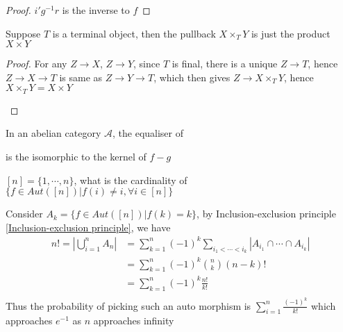 \documentclass[main]{subfiles}
\begin{document}
\begin{proof}
$i'g^{-1}r$ is the inverse to $f$
\end{proof}

\begin{exercise}
Suppose $T$ is a terminal object, then the pullback $X\times_TY$ is just the product $X\times Y$
\end{exercise}

\begin{proof}
For any $Z\to X$, $Z\to Y$, since $T$ is final, there is a unique $Z\to T$, hence $Z\to X\to T$ is same as $Z\to Y\to T$, which then gives $Z\to X\times_TY$, hence $X\times_TY=X\times Y$
\begin{center}
\end{center}
\end{proof}

\begin{exercise}
In an abelian category $\mathscr A$, the equaliser of  is the isomorphic to the kernel of $f-g$
\end{exercise}

\begin{exercise}
$[n]=\{1,\cdots,n\}$, what is the cardinality of $\{f\in Aut([n])|f(i)\neq i,\forall i\in[n]\}$
\end{exercise}

\begin{solution}
Consider $A_k=\{f\in Aut([n])|f(k)=k\}$, by Inclusion-exclusion principle \ref{Inclusion-exclusion principle}, we have
\begin{align*}
n!=\left|\bigcup_{i=1}^nA_n\right|&=\sum_{k=1}^n(-1)^k\sum_{i_1<\cdots<i_k}\left|A_{i_1}\cap\cdots\cap A_{i_k}\right| \\
&=\sum_{k=1}^n(-1)^k\binom{n}{k}(n-k)! \\
&=\sum_{k=1}^n(-1)^k\frac{n!}{k!} \\
\end{align*}
Thus the probability of picking such an auto morphism is $\displaystyle\sum_{i=1}^n\frac{(-1)^k}{k!}$ which approaches $e^{-1}$ as $n$ approaches infinity
\end{solution}
\end{document}
